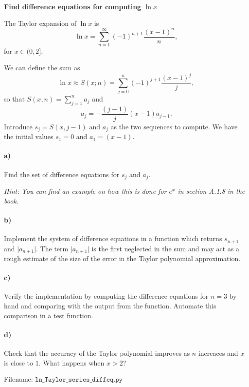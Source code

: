 \begin{Problem}{\textbf{Find difference equations for computing $\ln x$}}

\noindent
The Taylor expansion of $\ln x$ is
\begin{equation*}
\ln x = \sum_{n = 1}^\infty (-1)^{n + 1}\frac{(x - 1)^ n}{n},
\end{equation*}
for $x \in (0, 2]$.

We can define the sum as
\begin{equation*}
\ln x \approx S(x; n) = \sum_{j = 0}^n (-1)^{j + 1}\frac{(x - 1)^ j}{j},
\end{equation*}
so that $S(x, n) = \sum_{j = 1}^n a_j$ and
\begin{equation*}
a_j = -\frac{(j-1)}{j}(x - 1)a_{j-1}.
\end{equation*}
Introduce $s_j = S(x, j - 1)$ and $a_j$ as the two sequences to compute. We have
the initial values $s_1 = 0$ and $a_1 = (x - 1)$.

\paragraph{a)}
Find the set of difference equations for $s_j$ and $a_j$.

\emph{Hint: You can find an example on how this is done for $e^x$ in
section A.1.8 in the book.}

\paragraph{b)}
Implement the system of difference equations in a function
 which returns $s_{n + 1}$ and $\lvert a_{n+1}\rvert$.
The term $\lvert a_{n+1}\rvert$ is the first neglected in the sum and may act as a
rough estimate of the size of the error in the Taylor polynomial approximation.

\paragraph{c)}
Verify the implementation by computing the difference equations
for $n = 3$ by hand and comparing with the output from the 
function. Automate this comparison in a test function.

\paragraph{d)}
Check that the accuracy of the Taylor polynomial improves as $n$
increaces and $x$ is close to $1$. What happens when $x > 2$?

Filename: $\texttt{ln\_Taylor\_series\_diffeq.py}$
\end{Problem}

